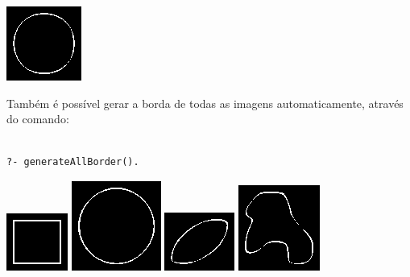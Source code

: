 \documentclass{article}
\begin{document}
\begin{center}
\includegraphics[scale=1.00]{texImgs/border_img1.eps}
\end{center}

	Também é possível gerar a borda de todas as imagens automaticamente, através do comando:

\begin{center}
\begin{minipage}{13cm}
\begin{Verbatim}

?- generateAllBorder().

\end{Verbatim}
\end{minipage}
\end{center}	

\begin{center}
\includegraphics[scale=1.00]{texImgs/border_img2.eps}
\includegraphics[scale=1.00]{texImgs/border_img3.eps}
\includegraphics[scale=1.00]{texImgs/border_img4.eps}
\includegraphics[scale=1.00]{texImgs/border_img5.eps}
\end{center}
\end{document}
